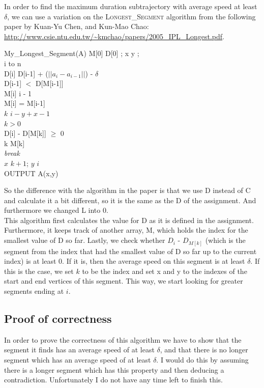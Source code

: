 \documentclass[a4paper,11pt]{article}
\begin{document}
In order to find the maximum duration subtrajectory with average speed at least $\delta$, we can use a variation on the \textsc{Longest\_Segment} algorithm from the following paper by Kuan-Yu Chen, and Kun-Mao Chao: \url{http://www.csie.ntu.edu.tw/~kmchao/papers/2005_IPL_Longest.pdf}. \\
\newpage
\begin{algorithm}{My\_Longest\_Segment}{(A)}
	M[0] \qlet D[0] ; x \qlet y ;\\
	\qfor i  to n \\
		D[i] \qlet D[i-1] + ($||a_i - a_{i-1}||$) - $\delta$\\
		\qif D[i-1] $<$ D[M[i-1]] \\
			\qthen M[i] \qlet i - 1 \\
			\qelse M[i] = M[i-1] \qend \\	
		$k$ \qlet $i-y+x-1$\\
		\qwhile $k > 0$ \\
			\qif D[i] - D[M[k]] $\geq$ 0\\
			\qthen k \qlet M[k] \\
			\qelse \textit{break} \qend \\
		$x$ \qlet $k+1$; $y$ \qlet $i$ \qend \\
		OUTPUT A(x,y) \qend \\
\end{algorithm} 

So the difference with the algorithm in the paper is that we use D instead of C and calculate it a bit different, so it is the same as the D of the assignment. And furthermore we changed L into 0.\\

This algorithm first calculates the value for D as it is defined in the assignment. Furthermore, it keeps track of another array, M, which holds the index for the smallest value of D so far. Lastly, we check whether $D_i$ - $D_{M[k]}$ (which is the segment from the index that had the smallest value of D so far up to the current index) is at least 0. If it is, then the average speed on this segment is at least $\delta$. If this is the case, we set $k$ to be the index and set x and y to the indexes of the start and end vertices of this segment. This way, we start looking for greater segments ending at $i$.

\subsection*{Proof of correctness}
In order to prove the correctness of this algorithm we have to show that the segment it finds has an average speed of at least $\delta$, and that there is no longer segment which has an average speed of at least $\delta$. I would do this by assuming there is a longer segment which has this property and then deducing a contradiction. Unfortunately I do not have any time left to finish this.
\end{document}

